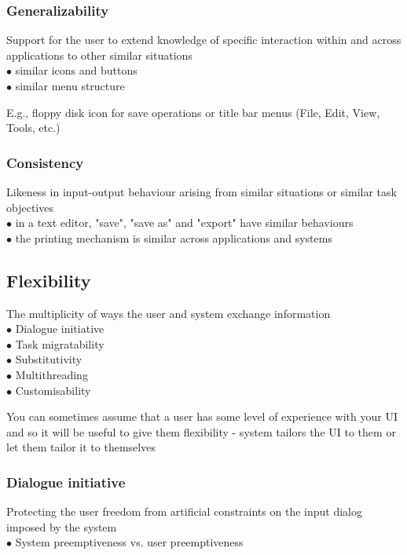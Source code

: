 \documentclass[]{project_plan}
\newcommand{\bulletPoint}{\hspace{-3.1pt}$\bullet$ \hspace{5pt}}
\begin{document}
\newpage

\subsubsection{Generalizability}
Support for the user to extend knowledge of specific interaction within and across
applications to other similar situations\\
\bulletPoint similar icons and buttons\\
\bulletPoint similar menu structure

E.g., floppy disk icon for save operations or title bar menus (File, Edit, View, Tools, etc.)

\subsubsection{Consistency}
Likeness in input-output behaviour arising from similar situations
or similar task objectives\\
\bulletPoint in a text editor, "save", "save as" and "export" have similar behaviours\\
\bulletPoint  the printing mechanism is similar across applications and systems

\subsection{Flexibility}
The multiplicity of ways the user and system exchange information\\
\bulletPoint Dialogue initiative\\
\bulletPoint Task migratability\\
\bulletPoint Substitutivity\\
\bulletPoint Multithreading\\
\bulletPoint Customisability

You can sometimes assume that a user has some level of experience with your
UI and so it will be useful to give them flexibility - system tailors the UI to them
or let them tailor it to themselves

\subsubsection{Dialogue initiative}
Protecting the user freedom from artificial constraints on the input dialog
imposed by the system\\
\bulletPoint System preemptiveness vs. user preemptiveness
\end{document}
